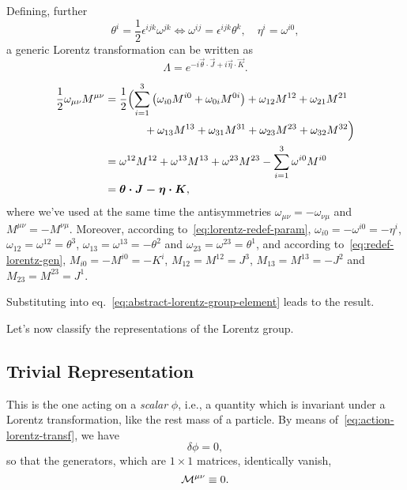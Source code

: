 Defining, further
\begin{equation}\label{eq:lorentz-redef-param}
    \theta^i = \frac{1}{2} \epsilon^{ijk} \omega^{jk} \iff \omega^{ij} = \epsilon^{ijk} \theta^k, \quad \eta^i = \omega^{i0} ,
\end{equation}
a generic Lorentz transformation can be written as
\begin{equation}
    \Lambda = e^{-i \vec{\theta} \cdot \vec{J} + i \vec{\eta} \cdot \vec{K}} .
\end{equation}
\begin{mdframed}
\begin{innerproof}
    \begin{equation*}
    \begin{split}
        \frac{1}{2} \omega_{\mu\nu} M^{\mu\nu} &= \frac{1}{2} \Bigl( \sum_{i=1}^3 \left( \omega_{i0} M^{i0} + \omega_{0i} M^{0i} \right) + \omega_{12} M^{12} + \omega_{21} M^{21} \\
        &\qquad \quad \; \; + \omega_{13} M^{13} + \omega_{31} M^{31} + \omega_{23} M^{23} + \omega_{32} M^{32} \Bigr) \\
        &= \omega^{12} M^{12} + \omega^{13} M^{13} + \omega^{23} M^{23} - \sum_{i=1}^3 \omega^{i0} M^{i0} \\
        &= \vec{\vec{\theta} \cdot \vec{J} - \vec{\eta} \cdot \vec{K}},
    \end{split}
    \end{equation*}
    where we've used at the same time the antisymmetries $\omega_{\mu\nu} = - \omega_{\nu\mu}$ and $M^{\mu\nu}=- M^{\nu\mu}$. Moreover, according to~\eqref{eq:lorentz-redef-param}, $\omega_{i0} = -\omega^{i0}=-\eta^i$, $\omega_{12} = \omega^{12} = \theta^3$, $\omega_{13} = \omega^{13} = - \theta^2$ and $\omega_{23} = \omega^{23} = \theta^1$, and according to~\eqref{eq:redef-lorentz-gen}, $M_{i0} = -M^{i0}=- K^i$, $M_{12} = M^{12} = J^3$, $M_{13} = M^{13} = - J^2$ and $M_{23} = M^{23} = J^1$.

    Substituting into eq.~\eqref{eq:abstract-lorentz-group-element} leads to the result.
\end{innerproof}
\end{mdframed}

Let's now classify the representations of the Lorentz group.


\subsection{Trivial Representation}
This is the one acting on a \emph{scalar} $\phi$, i.e., a quantity which is invariant under a Lorentz transformation, like the rest mass of a particle. By means of~\eqref{eq:action-lorentz-transf}, we have
\begin{equation}\label{eq:lorentz-transf-scalar}
    \delta \phi = 0,
\end{equation}
so that the generators, which are $1 \times 1$ matrices, identically vanish,
\begin{equation}
    \M^{\mu\nu} \equiv 0.
\end{equation}

